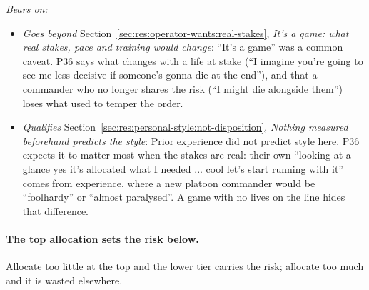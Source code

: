 \noindent\textit{Bears on:}
\begin{itemize}[leftmargin=1.2em,itemsep=1pt]\small
\item \textit{Goes beyond} Section~\ref{sec:res:operator-wants:real-stakes}, \emph{It's a game: what real stakes, pace and training would change}: ``It's a game'' was a common caveat. P36 says what changes with a life at stake (``I imagine you're going to see me less decisive if someone's gonna die at the end''), and that a commander who no longer shares the risk (``I might die alongside them'') loses what used to temper the order.
\item \textit{Qualifies} Section~\ref{sec:res:personal-style:not-disposition}, \emph{Nothing measured beforehand predicts the style}: Prior experience did not predict style here. P36 expects it to matter most when the stakes are real: their own ``looking at a glance yes it's allocated what I needed ... cool let's start running with it'' comes from experience, where a new platoon commander would be ``foolhardy'' or ``almost paralysed''. A game with no lives on the line hides that difference.
\end{itemize}


\label{sec:qual:practitioner:pt-resource-cascade}\paragraph{The top allocation sets the risk below.}
Allocate too little at the top and the lower tier carries the risk; allocate too much and it is wasted elsewhere.

